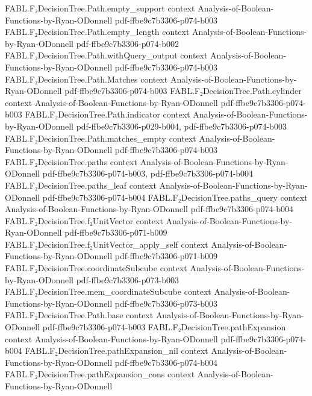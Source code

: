 \begin{theorem}
\proofstep
  {FABL.F₂DecisionTree.Path.empty_support}
  {context}
  {Analysis-of-Boolean-Functions-by-Ryan-ODonnell}
  {pdf-ffbe9c7b3306-p074-b003}
\proofstep
  {FABL.F₂DecisionTree.Path.empty_length}
  {context}
  {Analysis-of-Boolean-Functions-by-Ryan-ODonnell}
  {pdf-ffbe9c7b3306-p074-b002}
\proofstep
  {FABL.F₂DecisionTree.Path.withQuery_output}
  {context}
  {Analysis-of-Boolean-Functions-by-Ryan-ODonnell}
  {pdf-ffbe9c7b3306-p074-b003}
\proofstep
  {FABL.F₂DecisionTree.Path.Matches}
  {context}
  {Analysis-of-Boolean-Functions-by-Ryan-ODonnell}
  {pdf-ffbe9c7b3306-p074-b003}
\proofstep
  {FABL.F₂DecisionTree.Path.cylinder}
  {context}
  {Analysis-of-Boolean-Functions-by-Ryan-ODonnell}
  {pdf-ffbe9c7b3306-p074-b003}
\proofstep
  {FABL.F₂DecisionTree.Path.indicator}
  {context}
  {Analysis-of-Boolean-Functions-by-Ryan-ODonnell}
  {pdf-ffbe9c7b3306-p029-b004,
    pdf-ffbe9c7b3306-p074-b003}
\proofstep
  {FABL.F₂DecisionTree.Path.matches_empty}
  {context}
  {Analysis-of-Boolean-Functions-by-Ryan-ODonnell}
  {pdf-ffbe9c7b3306-p074-b003}
\proofstep
  {FABL.F₂DecisionTree.paths}
  {context}
  {Analysis-of-Boolean-Functions-by-Ryan-ODonnell}
  {pdf-ffbe9c7b3306-p074-b003,
    pdf-ffbe9c7b3306-p074-b004}
\proofstep
  {FABL.F₂DecisionTree.paths_leaf}
  {context}
  {Analysis-of-Boolean-Functions-by-Ryan-ODonnell}
  {pdf-ffbe9c7b3306-p074-b004}
\proofstep
  {FABL.F₂DecisionTree.paths_query}
  {context}
  {Analysis-of-Boolean-Functions-by-Ryan-ODonnell}
  {pdf-ffbe9c7b3306-p074-b004}
\proofstep
  {FABL.F₂DecisionTree.f₂UnitVector}
  {context}
  {Analysis-of-Boolean-Functions-by-Ryan-ODonnell}
  {pdf-ffbe9c7b3306-p071-b009}
\proofstep
  {FABL.F₂DecisionTree.f₂UnitVector_apply_self}
  {context}
  {Analysis-of-Boolean-Functions-by-Ryan-ODonnell}
  {pdf-ffbe9c7b3306-p071-b009}
\proofstep
  {FABL.F₂DecisionTree.coordinateSubcube}
  {context}
  {Analysis-of-Boolean-Functions-by-Ryan-ODonnell}
  {pdf-ffbe9c7b3306-p073-b003}
\proofstep
  {FABL.F₂DecisionTree.mem_coordinateSubcube}
  {context}
  {Analysis-of-Boolean-Functions-by-Ryan-ODonnell}
  {pdf-ffbe9c7b3306-p073-b003}
\proofstep
  {FABL.F₂DecisionTree.Path.base}
  {context}
  {Analysis-of-Boolean-Functions-by-Ryan-ODonnell}
  {pdf-ffbe9c7b3306-p074-b003}
\proofstep
  {FABL.F₂DecisionTree.pathExpansion}
  {context}
  {Analysis-of-Boolean-Functions-by-Ryan-ODonnell}
  {pdf-ffbe9c7b3306-p074-b004}
\proofstep
  {FABL.F₂DecisionTree.pathExpansion_nil}
  {context}
  {Analysis-of-Boolean-Functions-by-Ryan-ODonnell}
  {pdf-ffbe9c7b3306-p074-b004}
\proofstep
  {FABL.F₂DecisionTree.pathExpansion_cons}
  {context}
  {Analysis-of-Boolean-Functions-by-Ryan-ODonnell}

\end{theorem}
